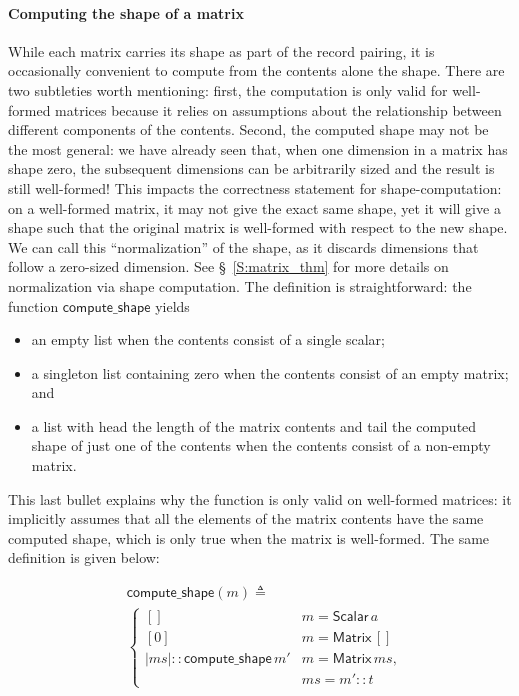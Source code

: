 \documentclass[11pt,conference]{IEEEtran}
\newcommand{\var}[1]{\mathit{#1}}
\newcommand{\func}[1]{\mathsf{#1}}
\theoremstyle{plain} %
\theoremstyle{definition}
\theoremstyle{remark}
\begin{document}
\paragraph{Computing the shape of a matrix} While each matrix carries its shape
as part of the record pairing, it is occasionally convenient to compute from the
contents alone the shape. There are two subtleties worth mentioning: first, the
computation is only valid for well-formed matrices because it relies on
assumptions about the relationship between different components of the contents.
Second, the computed shape may not be the most general: we have already seen
that, when one dimension in a matrix has shape zero, the subsequent dimensions
can be arbitrarily sized and the result is still well-formed! This impacts the
correctness statement for shape-computation: on a well-formed matrix, it may not
give the exact same shape, yet it will give a shape such that the original
matrix is well-formed with respect to the new shape. We can call this
``normalization'' of the shape, as it discards dimensions that follow a
zero-sized dimension. See \S~\ref{S:matrix_thm} for more details on
normalization via shape computation. The definition is straightforward: the
function \(\func{compute\_shape}\) yields
\begin{itemize}
    \item an empty list when the contents consist of a single scalar;
    \item a singleton list containing zero when the contents consist of an empty
        matrix; and
    \item a list with head the length of the matrix contents and tail the
        computed shape of just one of the contents when the contents
        consist of a non-empty matrix.
\end{itemize}
This last bullet explains why the function is only valid on well-formed
matrices: it implicitly assumes that all the elements of the matrix contents
have the same computed shape, which is only true when the matrix is well-formed.
The same definition is given below:

\begin{align*}
    & \func{compute\_shape}(\var{m}) \triangleq \\
    & \begin{cases}
        [] & m = \func{Scalar}\, a \\
        [0] & m = \func{Matrix}\, [] \\
        |\var{ms}| :: \func{compute\_shape}\, m' & m = \func{Matrix}\, \var{ms}, \\
        & \var{ms} = m'::t
    \end{cases}
\end{align*}
\end{document}

